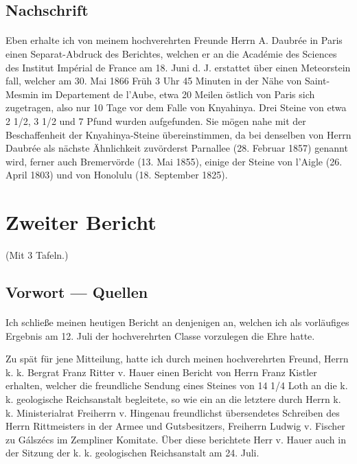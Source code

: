\documentclass[a4paper, 11pt, oneside, german]{article}
\begin{document}
\subsection{Nachschrift}
\paragraph{}
Eben erhalte ich von meinem hochverehrten Freunde Herrn A. Daubrée in Paris einen Separat-Abdruck des Berichtes, welchen er an die Académie des Sciences des Institut Impérial de France am 18. Juni d. J. erstattet über einen Meteorstein fall, welcher am 30. Mai 1866 Früh 3 Uhr 45 Minuten in der Nähe von Saint-Mesmin im Departement de l'Aube, etwa 20 Meilen östlich von Paris sich zugetragen, also nur 10 Tage vor dem Falle von Knyahinya. Drei Steine von etwa 2 1/2, 3 1/2 und 7 Pfund wurden aufgefunden. Sie mögen nahe mit der Beschaffenheit der Knyahinya-Steine übereinstimmen, da bei denselben von Herrn Daubrée als nächste Ähnlichkeit zuvörderst Parnallee (28. Februar 1857) genannt wird, ferner auch Bremervörde (13. Mai 1855), einige der Steine von l'Aigle (26. April 1803) und von Honolulu (18. September 1825).
\clearpage
\section{Zweiter Bericht}
\begin{center}
(Mit 3 Tafeln.) 
\end{center}
\subsection{Vorwort --- Quellen}
\paragraph{}
Ich schließe meinen heutigen Bericht an denjenigen an, welchen ich als vorläufiges Ergebnis am 12. Juli der hochverehrten Classe vorzulegen die Ehre hatte.

Zu spät für jene Mitteilung, hatte ich durch meinen hochverehrten Freund, Herrn k. k. Bergrat Franz Ritter v. Hauer einen Bericht von Herrn Franz Kistler erhalten, welcher die freundliche Sendung eines Steines von 14 1/4 Loth an die k. k. geologische Reichsanstalt begleitete, so wie ein an die letztere durch Herrn k. k. Ministerialrat Freiherrn v. Hingenau freundlichst übersendetes Schreiben des Herrn Rittmeisters in der Armee und Gutsbesitzers, Freiherrn Ludwig v. Fischer zu Gálszécs im Zempliner Komitate. Über diese berichtete Herr v. Hauer auch in der Sitzung der k. k. geologischen Reichsanstalt am 24. Juli.
\end{document}

